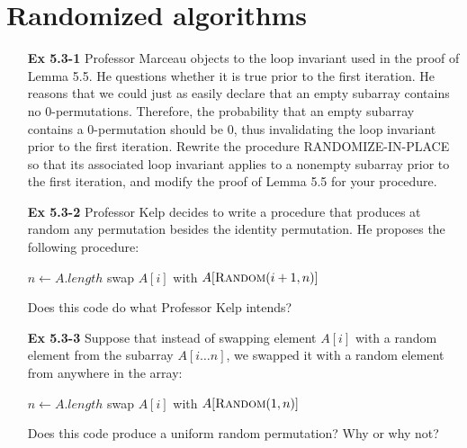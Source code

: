 \documentclass[fontsize=12pt,paper=a4]{book}
\newcommand{\To}{\ \textbf{to}\ }
\begin{document}
\section{Randomized algorithms}
\begin{enumerate}
 \item[\textbf{Ex 5.3-1}]
       Professor Marceau objects to the loop invariant used in the proof of Lemma 5.5. He questions whether it is true prior to the first iteration. He reasons that we could just as easily declare that an empty subarray contains no 0-permutations. Therefore, the probability that an empty subarray contains a 0-permutation should be 0, thus invalidating the loop invariant prior to the first iteration. Rewrite the procedure RANDOMIZE-IN-PLACE so that its associated loop invariant applies to a nonempty subarray prior to the first iteration, and modify the proof of Lemma 5.5 for your procedure.
       
 \item[\textbf{Ex 5.3-2}]
       Professor Kelp decides to write a procedure that produces at random any permutation besides the identity permutation. He proposes the following procedure:\\
       \begin{algorithmic}
        \State $n \gets A.length$\;
        \For{$i=1 \To n-1$}
        \State swap $A[i]$ with $A[\Call{Random}{i+1, n}]$
        \EndFor
        \EndProcedure
       \end{algorithmic}
       Does this code do what Professor Kelp intends?
       
 \item[\textbf{Ex 5.3-3}]
       Suppose that instead of swapping element $A[i]$ with a random element from the subarray $A[i \dots n]$, we swapped it with a random element from anywhere in the array:
       \begin{algorithmic}
        \State $n \gets A.length$
        \For{$i \gets i \To n$}
        \State swap $A[i]$ with $A[\Call{Random}{1,n}]$
        \EndFor
        \EndProcedure
       \end{algorithmic}
       Does this code produce a uniform random permutation? Why or why not?
       

\end{enumerate}
\end{document}

